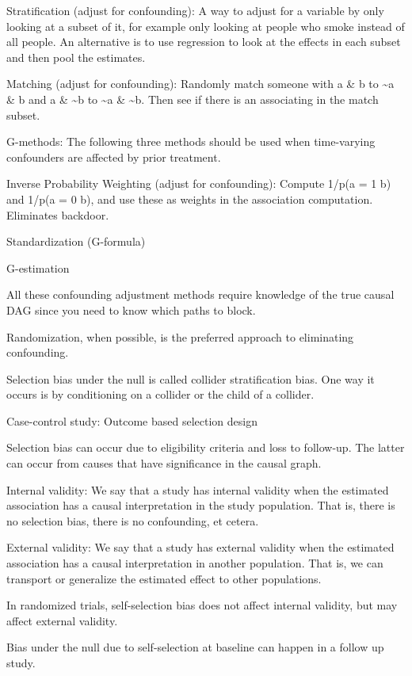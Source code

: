 \documentclass[]{book}
\begin{document}
Stratification (adjust for confounding): A way to adjust for a variable
by only looking at a subset of it, for example only looking at people
who smoke instead of all people. An alternative is to use regression to
look at the effects in each subset and then pool the estimates.

Matching (adjust for confounding): Randomly match someone with a \& b to
\textasciitilde{}a \& b and a \& \textasciitilde{}b to
\textasciitilde{}a \& \textasciitilde{}b. Then see if there is an
associating in the match subset.

G-methods: The following three methods should be used when time-varying
confounders are affected by prior treatment.

Inverse Probability Weighting (adjust for confounding): Compute 1/p(a =
1 \textbar{} b) and 1/p(a = 0 \textbar{} b), and use these as weights in
the association computation. Eliminates backdoor.

Standardization (G-formula)

G-estimation

All these confounding adjustment methods require knowledge of the true
causal DAG since you need to know which paths to block.

Randomization, when possible, is the preferred approach to eliminating
confounding.

Selection bias under the null is called collider stratification bias.
One way it occurs is by conditioning on a collider or the child of a
collider.

Case-control study: Outcome based selection design

Selection bias can occur due to eligibility criteria and loss to
follow-up. The latter can occur from causes that have significance in
the causal graph.

Internal validity: We say that a study has internal validity when the
estimated association has a causal interpretation in the study
population. That is, there is no selection bias, there is no
confounding, et cetera.

External validity: We say that a study has external validity when the
estimated association has a causal interpretation in another population.
That is, we can transport or generalize the estimated effect to other
populations.

In randomized trials, self-selection bias does not affect internal
validity, but may affect external validity.

Bias under the null due to self-selection at baseline can happen in a
follow up study.
\end{document}
